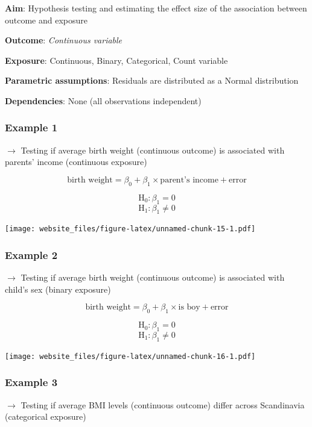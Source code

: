 \documentclass[12pt,]{article}
\begin{document}
\textbf{Aim}: Hypothesis testing and estimating the effect size of the
association between outcome and exposure

\textbf{Outcome}: \emph{Continuous variable}

\textbf{Exposure}: Continuous, Binary, Categorical, Count variable

\textbf{Parametric assumptions}: Residuals are distributed as a Normal
distribution

\textbf{Dependencies}: None (all observations independent)

\newpage

\subsubsection{Example 1}\label{example-1-4}

\(\rightarrow\) Testing if average birth weight (continuous outcome) is
associated with parents' income (continuous exposure)

\[\text{birth weight} = \beta_0 + \beta_1 \times \text{parent's income} + \text{error}\]

\[\text{H}_0: \beta_1 = 0\] \[\text{H}_1: \beta_1 \ne 0\]

\texttt{[image: website\_files/figure-latex/unnamed-chunk-15-1.pdf]}

\newpage

\subsubsection{Example 2}\label{example-2-4}

\(\rightarrow\) Testing if average birth weight (continuous outcome) is
associated with child's sex (binary exposure)

\[\text{birth weight} = \beta_0 + \beta_1 \times \text{is boy} + \text{error}\]

\[\text{H}_0: \beta_1 = 0\] \[\text{H}_1: \beta_1 \ne 0\]

\texttt{[image: website\_files/figure-latex/unnamed-chunk-16-1.pdf]}

\newpage

\subsubsection{Example 3}\label{example-3-4}

\(\rightarrow\) Testing if average BMI levels (continuous outcome)
differ across Scandinavia (categorical exposure)
\end{document}
